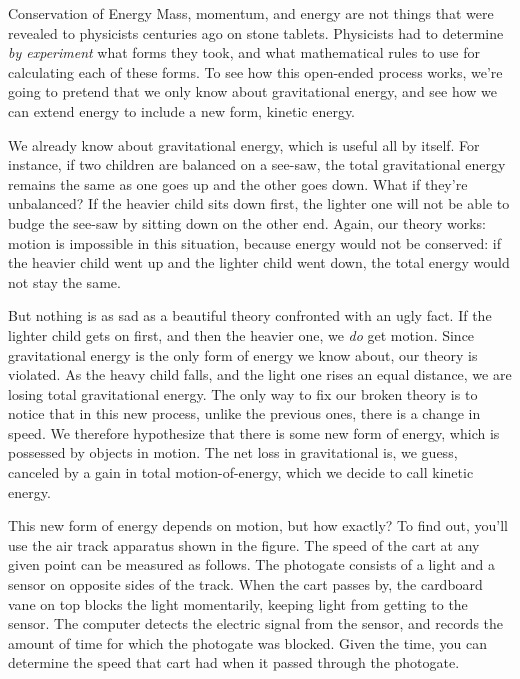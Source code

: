 \begin{lab}{Conservation of Energy}
Mass, momentum, and energy are not things that were revealed to physicists centuries ago on stone tablets.
Physicists had to determine \emph{by experiment} what forms they took, and what mathematical
rules to use for calculating each of these forms. To see how this open-ended process works, we're
going to pretend that we only know about gravitational energy, and see how we
can extend energy to include a new form, kinetic energy.

We already know about gravitational energy, which is useful all by itself.
For instance, if two children are balanced on a see-saw, the total gravitational energy remains the same as one
goes up and the other goes down. What if they're unbalanced? If the heavier child sits down first,
the lighter one will not be able to budge the see-saw by sitting down on the other end. Again, our
theory works: motion is impossible in this situation, because energy would not be conserved: if the
heavier child went up and the lighter child went down, the total energy would not stay the same.

But nothing is as sad as a beautiful theory confronted with an ugly fact. If the lighter child gets
on first, and then the heavier one, we \emph{do} get motion. Since gravitational energy is the only form of energy
we know about, our theory is violated. As the heavy child falls, and the light one rises an equal
distance, we are losing total gravitational energy. The only way to fix our broken theory is to notice that in this
new process, unlike the previous ones, there is a change in speed. We therefore hypothesize that there
is some new form of energy, which is possessed by objects in motion. The net loss in gravitational is, we
guess, canceled by a gain in total motion-of-energy, which we decide to call kinetic energy.


\pagebreak[4]

\labobservations



This new form of energy depends on motion, but how exactly? To find out,
you'll use the air track apparatus shown in the figure.
The speed of the cart at any given point can be measured as
follows.  The photogate consists of a light and a sensor on
opposite sides of the track.  When the cart passes by, the
cardboard vane on top blocks the light momentarily, keeping
light from getting to the sensor.  The computer detects the
electric signal from the sensor, and records the amount of
time for which the photogate was blocked.  Given
the time, you can determine the speed that cart had
when it passed through the photogate.


\end{lab}

